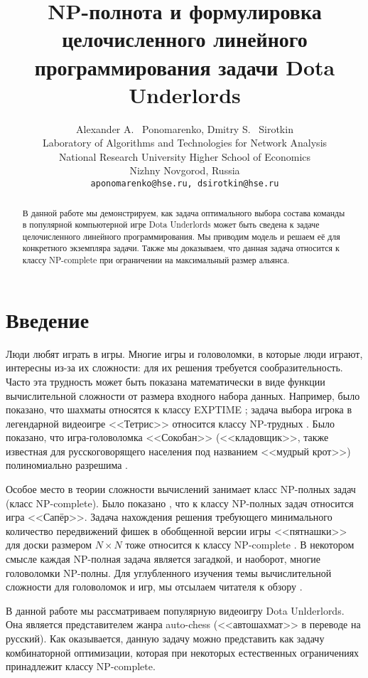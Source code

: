 \documentclass{article}
\title{NP-полнота и формулировка целочисленного линейного программирования задачи Dota Underlords}
\author{
  Alexander A. ~Ponomarenko, Dmitry S. ~Sirotkin \\
  Laboratory of Algorithms and Technologies for Network Analysis\\
  National Research University Higher School of Economics \\
  Nizhny Novgorod, Russia\\
  \texttt{aponomarenko@hse.ru, dsirotkin@hse.ru} \\
}
\begin{document}
\maketitle

\begin{abstract}
В данной работе мы демонстрируем, как задача оптимального выбора состава команды в популярной компьютерной игре Dota Underlords может быть сведена к задаче целочисленного линейного программирования. Мы приводим модель и решаем её для конкретного экземпляра задачи. Также мы доказываем, что данная задача относится к классу NP-complete при ограничении на максимальный размер альянса. 
\end{abstract}




\section{Введение}

Люди любят играть в игры. Многие игры и головоломки, в которые люди играют, интересны из-за их сложности: для их решения требуется сообразительность. Часто эта трудность может быть показана математически в виде функции вычислительной сложности от размера входного набора данных. Например, было показано, что шахматы относятся к классу EXPTIME \cite{fraenkel1981computing}; задача выбора игрока  в легендарной видеоигре <<Тетрис>> относится классу NP-трудных \cite{breukelaar2004tetris}. Было показано, что игра-головоломка <<Сокобан>> (<<кладовщик>>, также известная для русскоговорящего населения под названием <<мудрый крот>>) полиномиально разрешима \cite{hearn2005pspace}.

Особое место в теории сложности вычислений занимает класс NP-полных задач (класс NP-complete). 
Было показано  \cite{kaye2000minesweeper}, что к классу NP-полных задач относится игра <<Сапёр>>. Задача нахождения решения требующего минимального количество передвижений фишек в обобщенной версии игры <<пятнашки>> для доски размером $N \times N$ тоже относится к классу NP-complete \cite{ratner1986finding}. 
В некотором смысле каждая NP-полная задача является загадкой, и наоборот, многие головоломки NP-полны. Для углубленного изучения темы вычислительной сложности для головоломок и игр, мы отсылаем читателя к обзору \cite{costa2018computational}.

В данной работе мы рассматриваем популярную видеоигру Dota Unlderlords. Она является представителем жанра auto-chess (<<автошахмат>> в переводе на русский). Как оказывается, данную задачу можно представить как задачу комбинаторной оптимизации, которая при некоторых естественных ограничениях принадлежит классу NP-complete.
\end{document}
